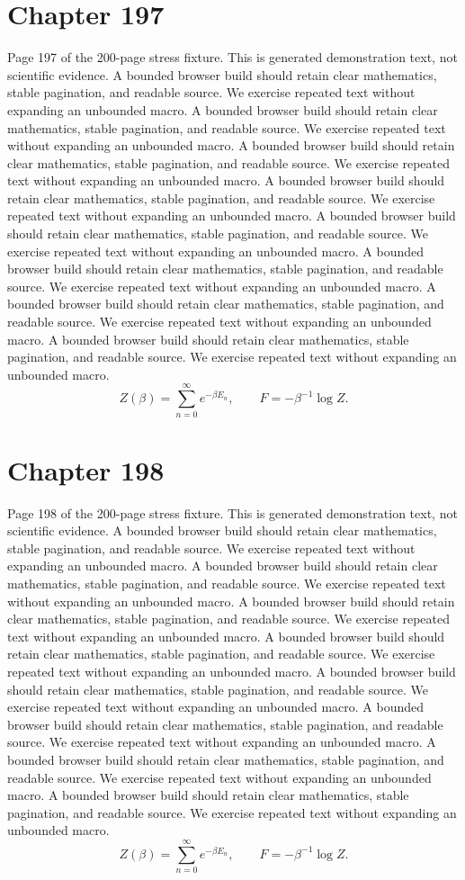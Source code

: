\documentclass[11pt]{article}
\begin{document}
\section*{Chapter 197}
Page 197 of the 200-page stress fixture. This is generated demonstration text, not scientific evidence.
A bounded browser build should retain clear mathematics, stable pagination, and readable source. We exercise repeated text without expanding an unbounded macro.
A bounded browser build should retain clear mathematics, stable pagination, and readable source. We exercise repeated text without expanding an unbounded macro.
A bounded browser build should retain clear mathematics, stable pagination, and readable source. We exercise repeated text without expanding an unbounded macro.
A bounded browser build should retain clear mathematics, stable pagination, and readable source. We exercise repeated text without expanding an unbounded macro.
A bounded browser build should retain clear mathematics, stable pagination, and readable source. We exercise repeated text without expanding an unbounded macro.
A bounded browser build should retain clear mathematics, stable pagination, and readable source. We exercise repeated text without expanding an unbounded macro.
A bounded browser build should retain clear mathematics, stable pagination, and readable source. We exercise repeated text without expanding an unbounded macro.
A bounded browser build should retain clear mathematics, stable pagination, and readable source. We exercise repeated text without expanding an unbounded macro.
\[Z(\beta)=\sum_{n=0}^{\infty}e^{-\beta E_n},\qquad F=-\beta^{-1}\log Z.\]
\newpage
\section*{Chapter 198}
Page 198 of the 200-page stress fixture. This is generated demonstration text, not scientific evidence.
A bounded browser build should retain clear mathematics, stable pagination, and readable source. We exercise repeated text without expanding an unbounded macro.
A bounded browser build should retain clear mathematics, stable pagination, and readable source. We exercise repeated text without expanding an unbounded macro.
A bounded browser build should retain clear mathematics, stable pagination, and readable source. We exercise repeated text without expanding an unbounded macro.
A bounded browser build should retain clear mathematics, stable pagination, and readable source. We exercise repeated text without expanding an unbounded macro.
A bounded browser build should retain clear mathematics, stable pagination, and readable source. We exercise repeated text without expanding an unbounded macro.
A bounded browser build should retain clear mathematics, stable pagination, and readable source. We exercise repeated text without expanding an unbounded macro.
A bounded browser build should retain clear mathematics, stable pagination, and readable source. We exercise repeated text without expanding an unbounded macro.
A bounded browser build should retain clear mathematics, stable pagination, and readable source. We exercise repeated text without expanding an unbounded macro.
\[Z(\beta)=\sum_{n=0}^{\infty}e^{-\beta E_n},\qquad F=-\beta^{-1}\log Z.\]
\newpage
\end{document}
